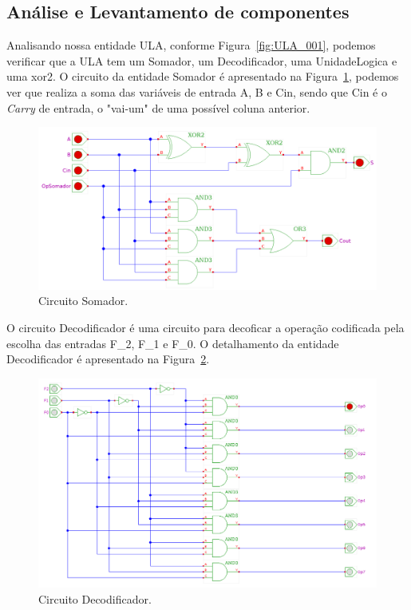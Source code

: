 \documentclass[a4paper,10pt]{report}
\begin{document}
\subsection {Análise e Levantamento de componentes}
Analisando nossa entidade ULA, conforme Figura~\ref{fig:ULA_001}, podemos verificar que a ULA tem um Somador, um Decodificador, uma UnidadeLogica e uma xor2.
O circuito da entidade Somador é apresentado na Figura~\ref{fig:Somador}, podemos ver que realiza a soma das variáveis de entrada A, B e Cin, sendo que Cin é o \emph{Carry} de entrada, o "vai-um" de uma possível coluna anterior.

\begin{figure}[H]
\centering
\includegraphics[width=1\textwidth]{figuras/somador.png}
\caption{Circuito Somador.}
\label{fig:Somador}
\end{figure}

O circuito Decodificador é uma circuito para decoficar a operação codificada pela escolha das entradas F\_2, F\_1 e F\_0. O detalhamento da entidade Decodificador é apresentado na Figura~\ref{fig:Decodificador}.

\begin{figure}[H]
\centering
\includegraphics[width=1\textwidth]{figuras/decodificador.png}
\caption{Circuito Decodificador.}
\label{fig:Decodificador}
\end{figure}
\end{document}
